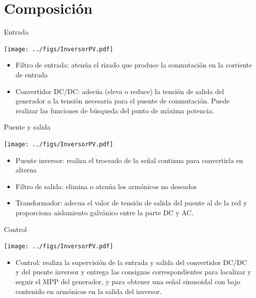 \documentclass[aspectratio=169, usenames,svgnames,dvipsnames]{beamer}
\begin{document}
\section{Composición}
\label{sec:org87431b8}
\begin{frame}[label={sec:org5349bd5}]{Entrada}
\begin{center}
\texttt{[image: ../figs/InversorPV.pdf]}
\end{center}

\begin{itemize}
\item \alert{Filtro de entrada}: atenúa el rizado que produce la conmutación en
la corriente de entrada

\item \alert{Convertidor DC/DC}: adecúa (eleva o reduce) la tensión de salida del
generador a la tensión necesaria para el puente de conmutación. Puede
realizar las funciones de búsqueda del punto de máxima potencia.
\end{itemize}
\end{frame}
\begin{frame}[label={sec:org2697297}]{Puente y salida}
\begin{center}
\texttt{[image: ../figs/InversorPV.pdf]}
\end{center}

\begin{itemize}
\item \alert{Puente inversor}: realiza el troceado de la señal continua para
convertirla en alterna

\item \alert{Filtro de salida}: elimina o atenúa los armónicos no deseados

\item \alert{Transformador}: adecua el valor de tensión de salida del puente al
de la red y proporciona aislamiento galvánico entre la parte DC y
AC.
\end{itemize}
\end{frame}
\begin{frame}[label={sec:org5dc4c69}]{Control}
\begin{center}
\texttt{[image: ../figs/InversorPV.pdf]}
\end{center}

\begin{itemize}
\item \alert{Control}: realiza la supervisión de la entrada y salida del
convertidor DC/DC y del puente inversor y entrega las consignas
correspondientes para localizar y seguir el MPP del generador, y para
obtener una señal sinusoidal con bajo contenido en armónicos en la
salida del inversor.
\end{itemize}
\end{frame}
\end{document}

